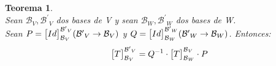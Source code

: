 \documentclass[]{article}
\newtheorem{theorem}{Teorema}
\newcommand{\base}{\text{$\mathcal{B}$}}
\newcommand{\basep}{\text{$\mathcal{B}^{\prime}$}}
\begin{document}
\begin{theorem}
    \\
    Sean $\base_V,\basep_V$ dos bases de V y sean  $\base_W,\basep_W$ dos bases de W.\\
    Sean $P=\cbs{Id}{\base_V}{\basep_V} (\basep_V\rightarrow\base_V)$
    y $Q=\cbs{Id}{\base_W}{\basep_W} (\basep_W\rightarrow\base_W)$. Entonces:
    \begin{align*}
        \cbs{T}{\base_V}{\basep_V}= Q^{-1} \cdot \cbs{T}{\base_W}{\base_V} \cdot P
    \end{align*}
\end{theorem}
\end{document}

